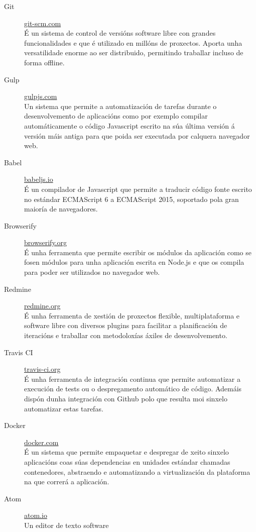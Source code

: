   \begin{description}
   \item [Git] \href{https://git-scm.com/}{git-scm.com}\\ É un sistema de 
control de 
versións software libre con grandes funcionalidades e que é utilizado en 
millóns de proxectos. Aporta unha versatilidade enorme ao ser distribuido, 
permitindo traballar incluso de forma offline.
   \item [Gulp] \href{http://gulpjs.com/}{gulpjs.com}\\ Un sistema que permite 
a 
automatización de tarefas durante o desenvolvemento de aplicacións como por 
exemplo compilar automáticamente o código Javascript escrito na súa última 
versión á versión máis antiga para que poida ser executada por calquera 
navegador web.
    \item [Babel] \href{https://babeljs.io/}{babeljs.io}\\ É un compilador de 
Javascript que permite a traducir código fonte escrito no estándar ECMAScript 6 
a ECMAScript 2015, soportado pola gran maioría de navegadores.
    \item [Browserify] \href{http://browserify.org/}{browserify.org}\\ É unha 
ferramenta 
que permite escribir os módulos da aplicación como se fosen módulos para unha 
aplicación escrita en Node.js e que os compila para poder ser utilizados no 
navegador web.
   \item [Redmine] \href{http://www.redmine.org/}{redmine.org}\\ É unha 
ferramenta de 
xestión de proxectos flexible, multiplataforma e software libre con diversos 
plugins para facilitar a planificación de iteracións e traballar con 
metodoloxías áxiles de desenvolvemento.
   \item [Travis CI] \href{https://travis-ci.org/}{travis-ci.org}\\ É unha 
ferramenta de 
integración continua que permite automatizar a execución de tests ou o 
despregamento automático de código. Ademáis dispón dunha integración con Github 
polo que resulta moi sinxelo automatizar estas tarefas.
   \item [Docker] \href{https://www.docker.com/}{docker.com}\\ É un sistema 
que permite 
empaquetar e despregar de xeito sinxelo aplicacións coas súas dependencias en 
unidades estándar chamadas contenedores, abstraendo e automatizando a 
virtualización da plataforma na que correrá a aplicación.
   \item [Atom] \href{https://atom.io/}{atom.io}\\ Un editor de texto software 

\end{description}
